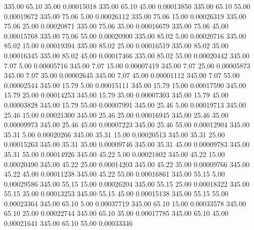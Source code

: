     335.00     65.10     35.00     0.00015018
    335.00     65.10     45.00     0.00013850
    335.00     65.10     55.00     0.00019672
    335.00     75.06      5.00     0.00026112
    335.00     75.06     15.00     0.00026319
    335.00     75.06     25.00     0.00020871
    335.00     75.06     35.00     0.00016679
    335.00     75.06     45.00     0.00015768
    335.00     75.06     55.00     0.00020900
    335.00     85.02      5.00     0.00020716
    335.00     85.02     15.00     0.00019394
    335.00     85.02     25.00     0.00016519
    335.00     85.02     35.00     0.00016345
    335.00     85.02     45.00     0.00017466
    335.00     85.02     55.00     0.00020442
    345.00      7.07      5.00     0.00005716
    345.00      7.07     15.00     0.00007419
    345.00      7.07     25.00     0.00005873
    345.00      7.07     35.00     0.00002645
    345.00      7.07     45.00     0.00001112
    345.00      7.07     55.00     0.00002544
    345.00     15.79      5.00     0.00015111
    345.00     15.79     15.00     0.00017590
    345.00     15.79     25.00     0.00014253
    345.00     15.79     35.00     0.00007303
    345.00     15.79     45.00     0.00003828
    345.00     15.79     55.00     0.00007991
    345.00     25.46      5.00     0.00019713
    345.00     25.46     15.00     0.00021300
    345.00     25.46     25.00     0.00016945
    345.00     25.46     35.00     0.00009973
    345.00     25.46     45.00     0.00007223
    345.00     25.46     55.00     0.00012904
    345.00     35.31      5.00     0.00020266
    345.00     35.31     15.00     0.00020513
    345.00     35.31     25.00     0.00015263
    345.00     35.31     35.00     0.00009746
    345.00     35.31     45.00     0.00009783
    345.00     35.31     55.00     0.00014926
    345.00     45.22      5.00     0.00021802
    345.00     45.22     15.00     0.00020490
    345.00     45.22     25.00     0.00014203
    345.00     45.22     35.00     0.00009766
    345.00     45.22     45.00     0.00011238
    345.00     45.22     55.00     0.00016861
    345.00     55.15      5.00     0.00029586
    345.00     55.15     15.00     0.00026204
    345.00     55.15     25.00     0.00018322
    345.00     55.15     35.00     0.00013253
    345.00     55.15     45.00     0.00015138
    345.00     55.15     55.00     0.00023364
    345.00     65.10      5.00     0.00037719
    345.00     65.10     15.00     0.00033578
    345.00     65.10     25.00     0.00022744
    345.00     65.10     35.00     0.00017785
    345.00     65.10     45.00     0.00021641
    345.00     65.10     55.00     0.00033346
